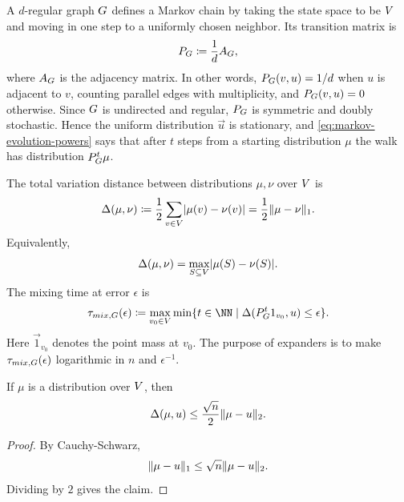 A \(d\)-regular graph \(G\) defines a Markov chain by taking the state space to be \(V\) and moving in one step to a uniformly chosen neighbor. Its transition matrix is
\begin{equation}
	\label{eq:graph-random-walk-transition}
	P_{G} \coloneqq \frac{1}{d}A_{G},
\end{equation}
where \(A_{G}\) is the adjacency matrix. In other words, \(P_{G}(v,u)=1/d\) when \(u\) is adjacent to \(v\), counting parallel edges with multiplicity, and \(P_{G}(v,u)=0\) otherwise. Since \(G\) is undirected and regular, \(P_{G}\) is symmetric and doubly stochastic. Hence the uniform distribution \(\vec{u}\) is stationary, and \cref{eq:markov-evolution-powers} says that after \(t\) steps from a starting distribution \(\mu\) the walk has distribution \(P_{G}^{t}\mu\).

The total variation distance between distributions \(\mu,\nu\) over \(V\) is
\begin{equation}
	\Delta(\mu,\nu) \coloneqq \frac{1}{2}\sum_{v\in V}\lvert\mu(v)-\nu(v)\rvert=\frac{1}{2}\lVert\mu-\nu\rVert_1.
\end{equation}
Equivalently,
\begin{equation}
	\Delta(\mu,\nu)=\max_{S\subseteq V}\lvert\mu(S)-\nu(S)\rvert.
\end{equation}
The mixing time at error \(\epsilon\) is
\begin{equation}
	\tau_{\mathrm{mix},\Graph}(\epsilon)\coloneqq \max_{v_0\in \Vertices}\min\{t\in\NN \mid \StatDist(\Markov{\Graph}^t\vec{1}_{v_0},\vec{u})\leq \epsilon\}.
\end{equation}
Here \(\vec{1}_{v_0}\) denotes the point mass at \(v_0\). The purpose of expanders is to make \(\tau_{mix,G}(\epsilon)\) logarithmic in \(n\) and \(\epsilon^{-1}\).

\begin{lemma}
	\label{lem:l2-tv}
	If \(\mu\) is a distribution over \(V\), then
	\begin{equation}
		\Delta(\mu,u)\leq \frac{\sqrt{n}}{2}\lVert\mu-u\rVert_2.
	\end{equation}
\end{lemma}

\begin{proof}
	By Cauchy-Schwarz,
	\begin{equation}
		\lVert\mu-u\rVert_1\leq \sqrt{n}\lVert\mu-u\rVert_2.
	\end{equation}
	Dividing by \(2\) gives the claim.
\end{proof}

